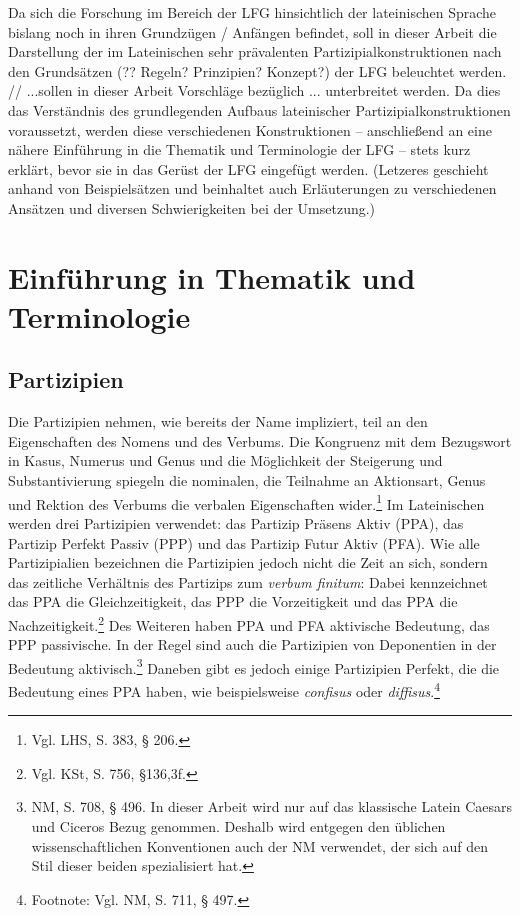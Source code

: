 \documentclass[12pt,a4paper]{article}
\begin{document}
Da sich die Forschung im Bereich der LFG hinsichtlich der lateinischen Sprache bislang noch in ihren Grundzügen / Anfängen befindet, soll in dieser Arbeit die Darstellung der im Lateinischen sehr prävalenten Partizipialkonstruktionen nach den Grundsätzen (?? Regeln? Prinzipien? Konzept?) der LFG beleuchtet werden. // ...sollen in dieser Arbeit Vorschläge bezüglich ... unterbreitet werden. Da dies das Verständnis des grundlegenden Aufbaus lateinischer Partizipialkonstruktionen voraussetzt, werden diese verschiedenen Konstruktionen  -- anschließend an eine nähere Einführung in die Thematik und Terminologie der LFG -- stets kurz erklärt, bevor sie in das Gerüst der LFG eingefügt werden. (Letzeres geschieht anhand von Beispielsätzen und beinhaltet auch Erläuterungen zu verschiedenen Ansätzen und diversen Schwierigkeiten bei der Umsetzung.)

\section{Einführung in Thematik und Terminologie}
\subsection{Partizipien}
Die Partizipien nehmen, wie bereits der Name impliziert, teil an den Eigenschaften des Nomens und des Verbums. Die Kongruenz mit dem Bezugswort in Kasus, Numerus und Genus und die Möglichkeit der Steigerung und Substantivierung spiegeln die nominalen, die Teilnahme an Aktionsart, Genus und Rektion des Verbums die verbalen Eigenschaften wider.\footnote{Vgl. LHS, S. 383, § 206.}
Im Lateinischen werden drei Partizipien verwendet: das Partizip Präsens Aktiv (PPA), das Partizip Perfekt Passiv (PPP) und das Partizip Futur Aktiv (PFA).
Wie alle Partizipialien bezeichnen die Partizipien jedoch nicht die Zeit an sich, sondern das zeitliche Verhältnis des Partizips zum \textit{verbum finitum}: Dabei kennzeichnet das PPA die Gleichzeitigkeit, das PPP die Vorzeitigkeit und das PPA die Nachzeitigkeit.\footnote{Vgl. KSt, S. 756, §136,3f.}
Des Weiteren haben PPA und PFA aktivische Bedeutung, das PPP passivische. In der Regel sind auch die Partizipien von Deponentien in der Bedeutung aktivisch.\footnote{NM, S. 708, § 496. In dieser Arbeit wird nur auf das klassische Latein Caesars und Ciceros Bezug genommen. Deshalb wird entgegen den üblichen wissenschaftlichen Konventionen auch der NM verwendet, der sich auf den Stil dieser beiden spezialisiert hat.} Daneben gibt es jedoch einige Partizipien Perfekt, die die Bedeutung eines PPA haben, wie beispielsweise \textit{confisus} oder \textit{diffisus}.\footnote{Footnote: Vgl. NM, S. 711, § 497.}
\end{document}
